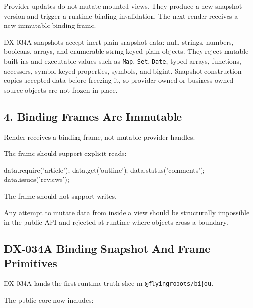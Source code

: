 Provider updates do not mutate mounted views. They produce a new snapshot version and trigger a runtime binding invalidation. The next render receives a new immutable binding frame.

DX-034A snapshots accept inert plain snapshot data: null, strings, numbers, booleans, arrays, and enumerable string-keyed plain objects. They reject mutable built-ins and executable values such as \texttt{M\allowbreak{}a\allowbreak{}p}, \texttt{S\allowbreak{}e\allowbreak{}t}, \texttt{D\allowbreak{}a\allowbreak{}t\allowbreak{}e}, typed arrays, functions, accessors, symbol-keyed properties, symbols, and bigint. Snapshot construction copies accepted data before freezing it, so provider-owned or business-owned source objects are not frozen in place.

\subsection{4. Binding Frames Are Immutable}\label{record-132-binding-frames-are-immutable}

Render receives a binding frame, not mutable provider handles.

The frame should support explicit reads:

\begin{CodeBlock}
data.require('article');
data.get('outline');
data.status('comments');
data.issues('reviews');
\end{CodeBlock}

The frame should not support writes.

Any attempt to mutate data from inside a view should be structurally impossible in the public API and rejected at runtime where objects cross a boundary.

\subsection{DX-034A Binding Snapshot And Frame Primitives}\label{record-132-dx-034a-binding-snapshot-and-frame-primitives}

DX-034A lands the first runtime-truth slice in \texttt{@\allowbreak{}f\allowbreak{}l\allowbreak{}y\allowbreak{}i\allowbreak{}n\allowbreak{}g\allowbreak{}r\allowbreak{}o\allowbreak{}b\allowbreak{}o\allowbreak{}t\allowbreak{}s\allowbreak{}/\allowbreak{}b\allowbreak{}i\allowbreak{}j\allowbreak{}o\allowbreak{}u}.

The public core now includes:

